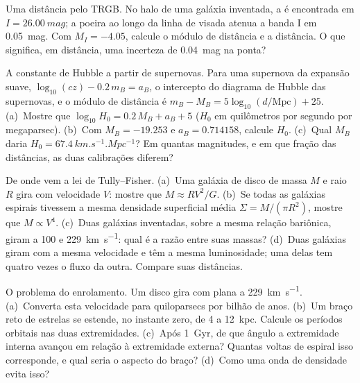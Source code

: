 \begin{exercise}[$\star\star$]\label{exo:b3:milky-way-galaxies:8}
Uma distância pelo TRGB. No halo de uma galáxia inventada, a  é encontrada em $I = \qty{26.00}{mag}$; a poeira ao longo da linha de
visada atenua a banda I em \qty{0.05}{mag}. Com $M_I = -4.05$, calcule o
módulo de distância e a distância. O que significa, em distância, uma incerteza de
\qty{0.04}{mag} na ponta?
\end{exercise}

\begin{exercise}[$\star\star$]\label{exo:b3:milky-way-galaxies:9}
A constante de Hubble a partir de supernovas. Para uma supernova da expansão
suave, $\log_{10}(cz) - 0.2\,m_B = a_B$, o intercepto do
diagrama de Hubble das supernovas, e o módulo de distância é
$m_B - M_B = 5\log_{10}(d/\mathrm{Mpc}) + 25$. (a)~Mostre que
$\log_{10}H_0 = 0.2\,M_B + a_B + 5$ ($H_0$ em quilômetros por segundo por
megaparsec). (b)~Com $M_B = -19.253$ e $a_B = 0.714158$, calcule $H_0$.
(c)~Qual $M_B$ daria $H_0 = \qty{67.4}{km.s^{-1}.Mpc^{-1}}$? Em quantas
magnitudes, e em que fração das distâncias, as duas
calibrações diferem?
\end{exercise}

\begin{exercise}[$\star\star\star$]\label{exo:b3:milky-way-galaxies:10}
De onde vem a lei de Tully--Fisher. (a)~Uma galáxia de disco de massa $M$
e raio $R$ gira com velocidade $V$: mostre que $M \approx RV^2/G$. (b)~Se todas
as galáxias espirais tivessem a mesma densidade superficial média $\Sigma = M/(\pi R^2)$,
mostre que $M \propto V^4$. (c)~Duas galáxias inventadas, sobre a mesma relação bariônica,
giram a 100 e \qty{229}{km.s^{-1}}: qual é a razão entre
suas massas? (d)~Duas galáxias giram com a mesma velocidade e têm a mesma
luminosidade; uma delas tem quatro vezes o fluxo da outra. Compare suas
distâncias.
\end{exercise}

\begin{exercise}[$\star\star\star$]\label{exo:b3:milky-way-galaxies:11}
O problema do enrolamento. Um disco gira com  plana a
\qty{229}{km.s^{-1}}. (a)~Converta esta velocidade para quiloparsecs por bilhão
de anos. (b)~Um braço reto de estrelas se estende, no instante zero, de 4 a
\qty{12}{kpc}. Calcule os períodos orbitais nas duas extremidades. (c)~Após
\qty{1}{Gyr}, de que ângulo a extremidade interna avançou em relação à
extremidade externa? Quantas voltas de espiral isso corresponde, e qual seria o aspecto do braço?
(d)~Como uma onda de densidade evita isso?
\end{exercise}

